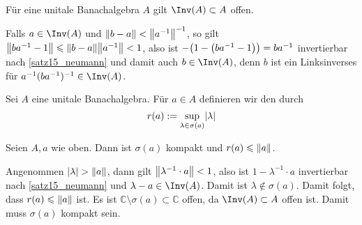 \begin{korollar}[{name=[Invertierbare Elemente bilden offene Menge]}]
	Für eine unitale Banachalgebra $A$ gilt $\Inv(A) \subset A$ offen.
\end{korollar}
\begin{beweis}
	Falls $a \in \Inv(A)$ und $\norm{b-a} < \norm{a^{-1}}^{-1}$, so gilt $\norm{b a^{-1} -1} \le \norm{b-a} \norm{a^{-1}}<1$, also ist 
	$-\enbrace*{1- \enbrace*{ba^{-1} -1}} = ba^{-1}$ invertierbar nach \autoref{satz15_neumann} und damit auch $b \in \Inv(A)$, denn $b$ ist ein Linksinverses für 
	$a^{-1}(ba^{-1})^{-1} \in \Inv(A)$.
\end{beweis}

\begin{definition}[{name=[Spektralradius]}]
	Sei $A$ eine unitale Banachalgebra. Für $a \in A$ definieren wir den  durch
	\[
		r(a) := \sup_{\lambda \in \sigma(a)} \lvert\lambda\rvert 
	\] 
\end{definition}

\begin{proposition}[{name=[Spektrum ist kompakt und Spektralradius durch Norm beschränkt]}]
	Seien $A,a$ wie oben. Dann ist $\sigma(a)$ kompakt und $r(a) \le \norm{a}$.
\end{proposition}
\begin{beweis}
	Angenommen $\abs{\lambda} > \norm{a}$, dann gilt $\norm{\lambda^{-1} \cdot a} < 1$, also ist $1- \lambda^{-1} \cdot a$ invertierbar nach \autoref{satz15_neumann} und 
	$\lambda -a \in \Inv(A)$. Damit ist $\lambda \notin \sigma(a)$. Damit folgt, dass $r(a) \le \norm{a}$ ist. 	
	Es ist $\mathds{C} \setminus \sigma(a) \subset \mathds{C}$ offen, da $\Inv(A) \subset A$ offen ist. Damit muss $\sigma(a)$ kompakt sein.
\end{beweis}

